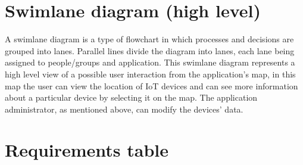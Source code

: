 \documentclass{scrreprt}
\begin{document}
\section{Swimlane diagram (high level)}

A swimlane diagram is a type of flowchart in which processes and decisions
are grouped into lanes. Parallel lines divide the diagram into lanes, each
lane being assigned to people/groups and application.
This swimlane diagram represents a high level view of a possible user interaction
from the application's map, in this map the user can view the location of
IoT devices and can see more information about a particular device by selecting
it on the map. The application administrator, as mentioned above, can modify the
devices' data.

\section{Requirements table}
\end{document}
